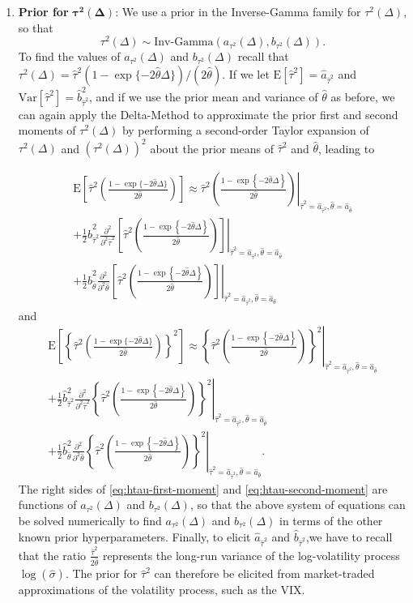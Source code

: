 \documentclass[10pt]{article}
\newcommand{\hb}{\hat{b}}
\newcommand{\ha}{\hat{a}}
\newcommand{\htheta}{\hat{\theta}}
\newcommand{\htau}{\hat{\tau}}
\newcommand{\E}[1]{\mbox{E}\left[#1\right]}
\newcommand{\Var}[1]{\mbox{Var}\left[#1\right]}
\newcommand{\expo}[1]{ \exp\left\{ #1 \right\}}
\newcommand{\tauSquareDelta}{\htau^2
  \left(\frac{1-\expo{-2\htheta\Delta}}{2\htheta} \right)}
\newcommand{\InvGam}[2]{\mbox{Inv-Gamma}\left( #1, #2 \right) }
\begin{document}
\begin{enumerate}[]
\item{\textbf{Prior for} $\boldsymbol{\tau^2}(\boldsymbol{\Delta})$:} We use a prior in the Inverse-Gamma family for $\tau^2(\Delta)$, so that
$$
\tau^2(\Delta) \sim \InvGam{ a_{\tau^2}(\Delta)}{b_{\tau^2}(\Delta) }.
$$
To find the values of $a_{\tau^2}(\Delta)$ and $b_{\tau^2}(\Delta)$ recall that $\tau^2(\Delta) = \htau^2 \left( 1 - \exp\{ -2\htheta \Delta \} \right)/ \left( 2\htheta \right)$.  If we let $\E{\htau^2} = \hat{a}_{\hat{\tau}^2}$ and $\Var{\htau^2} = \hat{b}^2_{\hat{\tau}^2}$, and if we use the prior mean and variance of $\htheta$ as before, we can again apply the Delta-Method to approximate the prior first and second moments of $\tau^2(\Delta)$ by performing a second-order Taylor expansion of $\tau^2(\Delta)$ and $(\tau^2(\Delta))^2$ about the prior means of $\htau^2$ and $\htheta$, leading to

\begin{multline} \label{eq:htau-first-moment}
\E{\htau^2 \left( \frac{1 - \exp\{ -2\htheta \Delta  \}}{2\htheta} \right)} \approx  \left. \tauSquareDelta \right|_{\htau^2 =  \ha_{\htau^2}, \htheta = \ha_{\htheta}}   \\
%
+  \frac{1}{2} \hb^2_{\htau^2}  \left. \frac{\partial^2}{\partial^2 \htau^2} \left[ \tauSquareDelta \right] \right|_{\htau^2 = \ha_{\htau^2}, \htheta = \ha_{\htheta}}   \\
+  \frac{1}{2} \hb^2_{\htheta}  \left. \frac{\partial^2}{\partial^2 \htheta} \left[ \tauSquareDelta \right] \right|_{\htau^2 = \ha_{\htau^2}, \htheta = \ha_{\htheta}}
\end{multline}
and
\begin{multline}  \label{eq:htau-second-moment}
\E{\left\{\htau^2 \left( \frac{1 - \exp\{ -2\htheta \Delta \}}{2\htheta} \right) \right\}^2} \approx  \left. \left\{ \tauSquareDelta\right\}^2 \right|_{\htau^2 = \ha_{\htau^2}, \htheta = \ha_{\htheta}}   \\
%
+  \frac{1}{2} \hb^2_{\htau^2}   \left. \frac{\partial^2}{\partial^2 \htau^2} \left\{ \tauSquareDelta \right\}^2 \right|_{\htau^2 = \ha_{\htau^2}, \htheta = \ha_{\htheta}}  \\
%
+  \frac{1}{2} \hb^2_{\htheta}   \left. \frac{\partial^2}{\partial^2 \htheta} \left\{ \tauSquareDelta \right\}^2 \right|_{\htau^2 = \ha_{\htau^2}, \htheta = \ha_{\htheta}}    .
\end{multline}
The right sides of \eqref{eq:htau-first-moment} and \eqref{eq:htau-second-moment} are functions of $a_{\tau^2}(\Delta)$ and $b_{\tau^2}(\Delta)$, so that the above system of equations can be solved numerically to find $a_{\tau^2}(\Delta)$ and $b_{\tau^2}(\Delta)$ in terms of the other known prior hyperparameters. Finally, to elicit $\ha_{\htau^2}$ and $\hb_{\htau^2}$,we have to recall that the ratio $\frac{\htau^2}{2\htheta}$ represents the long-run variance of the log-volatility process $\log(\hat{\sigma})$. The prior for $\htau^2$ can therefore be elicited from market-traded approximations of the volatility process, such as the VIX.



\end{enumerate}
\end{document}
